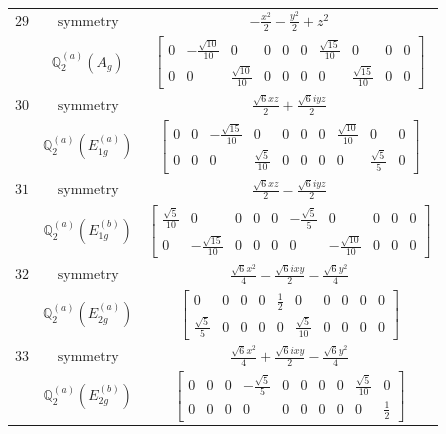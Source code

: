 \documentclass[fleqn,8pt,landscape]{jsarticle}
\begin{document}
\begin{longtable}{ccc}
$ 29 $ & $ \text{symmetry} $ & $ - \frac{x^{2}}{2} - \frac{y^{2}}{2} + z^{2} $ \\
$  $ & $ \mathbb{Q}_{2}^{(a)}(A_{g}) $ & $ \begin{bmatrix} 0 & - \frac{\sqrt{10}}{10} & 0 & 0 & 0 & 0 & \frac{\sqrt{15}}{10} & 0 & 0 & 0 \\ 0 & 0 & \frac{\sqrt{10}}{10} & 0 & 0 & 0 & 0 & \frac{\sqrt{15}}{10} & 0 & 0 \end{bmatrix} $ \\ \hline
$ 30 $ & $ \text{symmetry} $ & $ \frac{\sqrt{6} x z}{2} + \frac{\sqrt{6} i y z}{2} $ \\
$  $ & $ \mathbb{Q}_{2}^{(a)}(E_{1g}^{(a)}) $ & $ \begin{bmatrix} 0 & 0 & - \frac{\sqrt{15}}{10} & 0 & 0 & 0 & 0 & \frac{\sqrt{10}}{10} & 0 & 0 \\ 0 & 0 & 0 & \frac{\sqrt{5}}{10} & 0 & 0 & 0 & 0 & \frac{\sqrt{5}}{5} & 0 \end{bmatrix} $ \\ \hline
$ 31 $ & $ \text{symmetry} $ & $ \frac{\sqrt{6} x z}{2} - \frac{\sqrt{6} i y z}{2} $ \\
$  $ & $ \mathbb{Q}_{2}^{(a)}(E_{1g}^{(b)}) $ & $ \begin{bmatrix} \frac{\sqrt{5}}{10} & 0 & 0 & 0 & 0 & - \frac{\sqrt{5}}{5} & 0 & 0 & 0 & 0 \\ 0 & - \frac{\sqrt{15}}{10} & 0 & 0 & 0 & 0 & - \frac{\sqrt{10}}{10} & 0 & 0 & 0 \end{bmatrix} $ \\ \hline
$ 32 $ & $ \text{symmetry} $ & $ \frac{\sqrt{6} x^{2}}{4} - \frac{\sqrt{6} i x y}{2} - \frac{\sqrt{6} y^{2}}{4} $ \\
$  $ & $ \mathbb{Q}_{2}^{(a)}(E_{2g}^{(a)}) $ & $ \begin{bmatrix} 0 & 0 & 0 & 0 & \frac{1}{2} & 0 & 0 & 0 & 0 & 0 \\ \frac{\sqrt{5}}{5} & 0 & 0 & 0 & 0 & \frac{\sqrt{5}}{10} & 0 & 0 & 0 & 0 \end{bmatrix} $ \\ \hline
$ 33 $ & $ \text{symmetry} $ & $ \frac{\sqrt{6} x^{2}}{4} + \frac{\sqrt{6} i x y}{2} - \frac{\sqrt{6} y^{2}}{4} $ \\
$  $ & $ \mathbb{Q}_{2}^{(a)}(E_{2g}^{(b)}) $ & $ \begin{bmatrix} 0 & 0 & 0 & - \frac{\sqrt{5}}{5} & 0 & 0 & 0 & 0 & \frac{\sqrt{5}}{10} & 0 \\ 0 & 0 & 0 & 0 & 0 & 0 & 0 & 0 & 0 & \frac{1}{2} \end{bmatrix} $ \\ \hline

\end{longtable}
\end{document}
